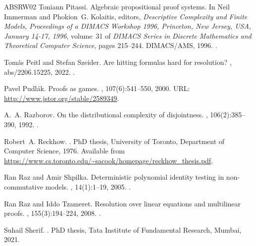 \documentclass[11pt]{article}
\numberwithin{equation}{section}
\begin{document}
\begin{thebibliography}{ABSRW02}
Toniann Pitassi.
\newblock Algebraic propositional proof systems.
\newblock In Neil Immerman and Phokion~G. Kolaitis, editors, {\em Descriptive
  Complexity and Finite Models, Proceedings of a {DIMACS} Workshop 1996,
  Princeton, New Jersey, USA, January 14-17, 1996}, volume~31 of {\em {DIMACS}
  Series in Discrete Mathematics and Theoretical Computer Science}, pages
  215--244. {DIMACS/AMS}, 1996.
\newblock \href {https://doi.org/10.1090/dimacs/031/07}
  {}.

Tom{\'{a}}s Peitl and Stefan Szeider.
\newblock Are hitting formulas hard for resolution?
, abs/2206.15225, 2022.
\newblock \href {https://doi.org/10.48550/arXiv.2206.15225}
  {}.

Pavel Pudl{\'{a}}k.
\newblock Proofs as games.
, 107(6):541--550, 2000.
\newblock URL: \url{http://www.jstor.org/stable/2589349}.

A.~A. Razborov.
\newblock On the distributional complexity of disjointness.
, 106(2):385--390, 1992.
\newblock \href {https://doi.org/10.1016/0304-3975(92)90260-M}
  {}.

Robert~A. Reckhow.
.
\newblock PhD thesis, University of Toronto, Department of Computer Science,
  1976.
\newblock Available from
  \url{https://www.cs.toronto.edu/~sacook/homepage/reckhow_thesis.pdf}.

Ran Raz and Amir Shpilka.
\newblock Deterministic polynomial identity testing in non-commutative models.
, 14(1):1--19, 2005.
\newblock \href {https://doi.org/10.1007/s00037-005-0188-8}
  {}.

Ran Raz and Iddo Tzameret.
\newblock Resolution over linear equations and multilinear proofs.
, 155(3):194--224, 2008.
\newblock \href {https://doi.org/10.1016/j.apal.2008.04.001}
  {}.

Suhail Sherif.
.
\newblock PhD thesis, Tata Institute of Fundamental Research, Mumbai, 2021.


\end{thebibliography}
\end{document}
